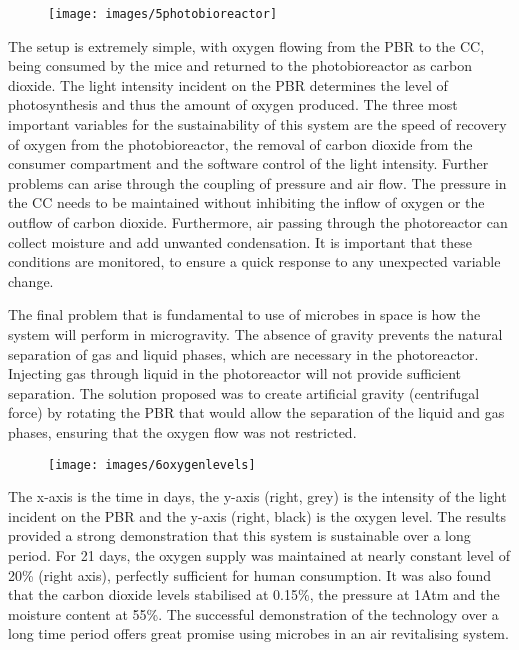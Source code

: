\documentclass[12pt]{article}
\begin{document}
\begin{figure}[ht]
\centering
\texttt{[image: images/5photobioreactor]}
\caption[\cite{agency2000exemple} A diagram showing the basic functionality of the experiment.]{}
\label{fig:5photobioreactor}
\end{figure}

The setup is extremely simple, with oxygen flowing from the PBR to the CC, being consumed by the mice and returned to the photobioreactor as carbon dioxide. The light intensity incident on the PBR determines the level of photosynthesis and thus the amount of oxygen produced. 
The three most important variables for the sustainability of this system are the speed of recovery of oxygen from the photobioreactor, the removal of carbon dioxide from the consumer compartment and the software control of the light intensity. Further problems can arise through the coupling of pressure and air flow. The pressure in the CC needs to be maintained without inhibiting the inflow of oxygen or the outflow of carbon dioxide. Furthermore, air passing through the photoreactor can collect moisture and add unwanted condensation. It is important that these conditions are monitored, to ensure a quick response to any unexpected variable change. 

The final problem that is fundamental to use of microbes in space is how the system will perform in microgravity. The absence of gravity prevents the natural separation of gas and liquid phases, which are necessary in the photoreactor. Injecting gas through liquid in the photoreactor will not provide sufficient separation. The solution proposed was to create artificial gravity (centrifugal force) by rotating the PBR that would allow the separation of the liquid and gas phases, ensuring that the oxygen flow was not restricted. 

\begin{figure}[ht]
\centering
\texttt{[image: images/6oxygenlevels]}
\caption [\cite{agency2000exemple}]{}
\label{fig:6oxygenlevels}
\end{figure}

The x-axis is the time in days, the y-axis (right, grey) is the intensity of the light incident on the PBR and the y-axis (right, black) is the oxygen level. 
The results provided a strong demonstration that this system is sustainable over a long period. For 21 days, the oxygen supply was maintained at nearly constant level of 20\% (right axis), perfectly sufficient for human consumption. It was also found that the carbon dioxide levels stabilised at 0.15\%, the pressure at 1Atm and the moisture content at 55\%. The successful demonstration of the technology over a long time period offers great promise using microbes in an air revitalising system.  
\end{document}
